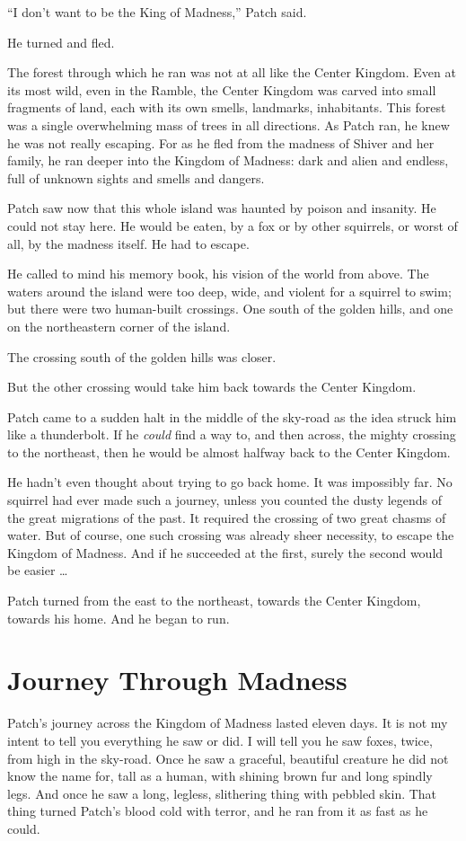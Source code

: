 \documentclass[ebook,oneside,openany,17pt]{memoir}
\renewcommand{\thechapter}{\Roman{chapter}}
\newcounter{sections}
\newcommand{\sections}[1]{%
  \section*{#1}
  \addtocounter{sections}{1}%
  \pdfbookmark[1]{#1}{section.\thechapter.\thesections}}
\begin{document}
“I don’t want to be the King of Madness,” Patch said.

He turned and fled.

The forest through which he ran was not at all like the Center
Kingdom. Even at its most wild, even in the Ramble, the Center Kingdom
was carved into small fragments of land, each with its own smells,
landmarks, inhabitants. This forest was a single overwhelming mass of
trees in all directions. As Patch ran, he knew he was not really
escaping. For as he fled from the madness of Shiver and her family, he
ran deeper into the Kingdom of Madness: dark and alien and endless,
full of unknown sights and smells and dangers.

Patch saw now that this whole island was haunted by poison and
insanity. He could not stay here. He would be eaten, by a fox or by
other squirrels, or worst of all, by the madness itself. He had to
escape.

He called to mind his memory book, his vision of the world from
above. The waters around the island were too deep, wide, and violent
for a squirrel to swim; but there were two human-built crossings. One
south of the golden hills, and one on the northeastern corner of the
island.

The crossing south of the golden hills was closer.

But the other crossing would take him back towards the Center Kingdom.

Patch came to a sudden halt in the middle of the sky-road as the idea
struck him like a thunderbolt. If he \emph{could} find a way to, and
then across, the mighty crossing to the northeast, then he would be
almost halfway back to the Center Kingdom.

He hadn’t even thought about trying to go back home. It was impossibly
far. No squirrel had ever made such a journey, unless you counted the
dusty legends of the great migrations of the past. It required the
crossing of two great chasms of water. But of course, one such
crossing was already sheer necessity, to escape the Kingdom of
Madness. And if he succeeded at the first, surely the second would be
easier …

Patch turned from the east to the northeast, towards the Center
Kingdom, towards his home. And he began to run.


\sections{Journey Through Madness}

Patch’s journey across the Kingdom of Madness lasted eleven days. It
is not my intent to tell you everything he saw or did. I will tell you
he saw foxes, twice, from high in the sky-road. Once he saw a
graceful, beautiful creature he did not know the name for, tall as a
human, with shining brown fur and long spindly legs. And once he saw a
long, legless, slithering thing with pebbled skin. That thing turned
Patch’s blood cold with terror, and he ran from it as fast as he
could.
\end{document}
